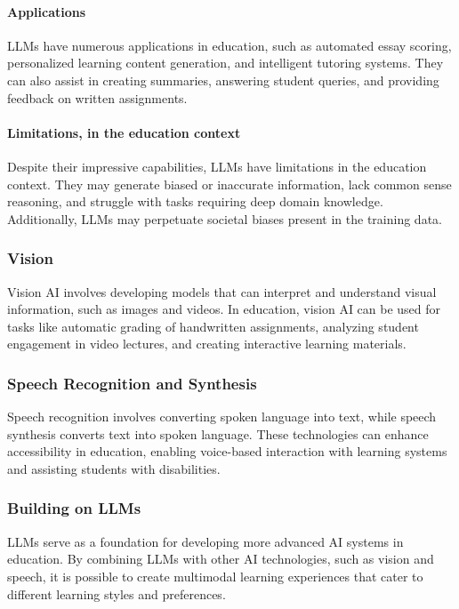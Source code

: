 \documentclass{article}
\begin{document}
\paragraph{Applications}
LLMs have numerous applications in education, such as automated essay scoring, personalized learning content generation, and intelligent tutoring systems. They can also assist in creating summaries, answering student queries, and providing feedback on written assignments.

\paragraph{Limitations, in the education context}
Despite their impressive capabilities, LLMs have limitations in the education context. They may generate biased or inaccurate information, lack common sense reasoning, and struggle with tasks requiring deep domain knowledge. Additionally, LLMs may perpetuate societal biases present in the training data.

\subsubsection{Vision}
Vision AI involves developing models that can interpret and understand visual information, such as images and videos. In education, vision AI can be used for tasks like automatic grading of handwritten assignments, analyzing student engagement in video lectures, and creating interactive learning materials.

\subsubsection{Speech Recognition and Synthesis}
Speech recognition involves converting spoken language into text, while speech synthesis converts text into spoken language. These technologies can enhance accessibility in education, enabling voice-based interaction with learning systems and assisting students with disabilities.

\subsubsection{Building on LLMs}
LLMs serve as a foundation for developing more advanced AI systems in education. By combining LLMs with other AI technologies, such as vision and speech, it is possible to create multimodal learning experiences that cater to different learning styles and preferences.
\end{document}
